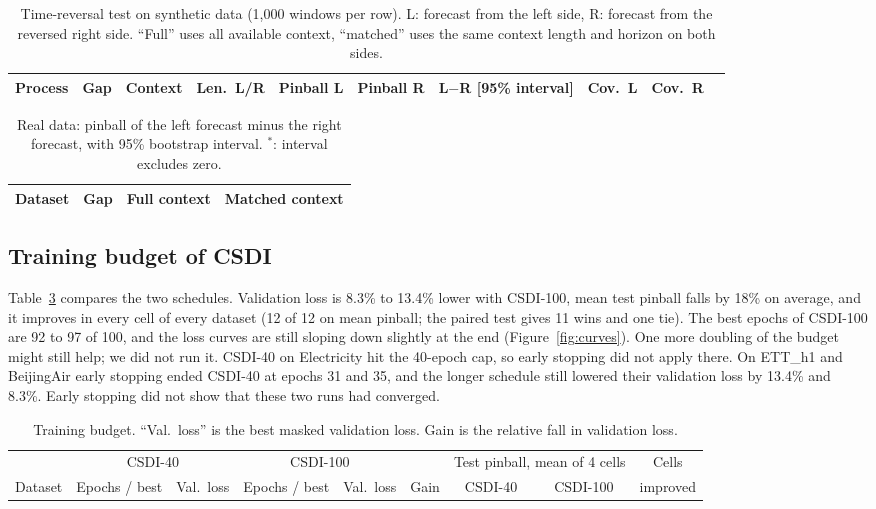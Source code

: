 \documentclass[10pt,twocolumn]{article}
\begin{document}
\begin{table}[t]
\centering\small
\setlength{\tabcolsep}{4.5pt}
\begin{tabular}{@{}llcccccccc@{}}
\toprule
Process & Gap & Context & Len.\ L/R & Pinball L & Pinball R & L$-$R [95\% interval] & Cov.\ L & Cov.\ R\\
\midrule

\end{tabular}
\caption{Time-reversal test on synthetic data (1,000 windows per row). L: forecast from the left side, R: forecast from the reversed right side. ``Full'' uses all available context, ``matched'' uses the same context length and horizon on both sides.}
\label{tab:reversal}
\end{table}

\begin{table}[t]
\centering\small
\footnotesize\setlength{\tabcolsep}{2.5pt}
\begin{tabular}{@{}lcll@{}}
\toprule
Dataset & Gap & Full context & Matched context\\
\midrule

\end{tabular}
\caption{Real data: pinball of the left forecast minus the right forecast, with 95\% bootstrap interval. $^*$: interval excludes zero.}
\label{tab:reversal-real}
\end{table}

\subsection{Training budget of CSDI}\label{sec:budget}
Table~\ref{tab:budget} compares the two schedules. Validation loss is 8.3\% to 13.4\% lower with CSDI-100, mean test pinball falls by 18\% on average, and it improves in every cell of every dataset (12 of 12 on mean pinball; the paired test gives 11 wins and one tie). The best epochs of CSDI-100 are 92 to 97 of 100, and the loss curves are still sloping down slightly at the end (Figure~\ref{fig:curves}). One more doubling of the budget might still help; we did not run it. CSDI-40 on Electricity hit the 40-epoch cap, so early stopping did not apply there. On ETT\_h1 and BeijingAir early stopping ended CSDI-40 at epochs 31 and 35, and the longer schedule still lowered their validation loss by 13.4\% and 8.3\%. Early stopping did not show that these two runs had converged.

\begin{table}[t]
\centering\small
\setlength{\tabcolsep}{5pt}
\begin{tabular}{@{}lcccccccc@{}}
\toprule
 & \multicolumn{2}{c}{CSDI-40} & \multicolumn{2}{c}{CSDI-100} & & \multicolumn{2}{c}{Test pinball, mean of 4 cells} & Cells\\
\cmidrule(lr){2-3}\cmidrule(lr){4-5}\cmidrule(lr){7-8}
Dataset & Epochs / best & Val.\ loss & Epochs / best & Val.\ loss & Gain & CSDI-40 & CSDI-100 & improved\\
\midrule

\end{tabular}
\caption{Training budget. ``Val.\ loss'' is the best masked validation loss. Gain is the relative fall in validation loss.}
\label{tab:budget}
\end{table}
\end{document}
